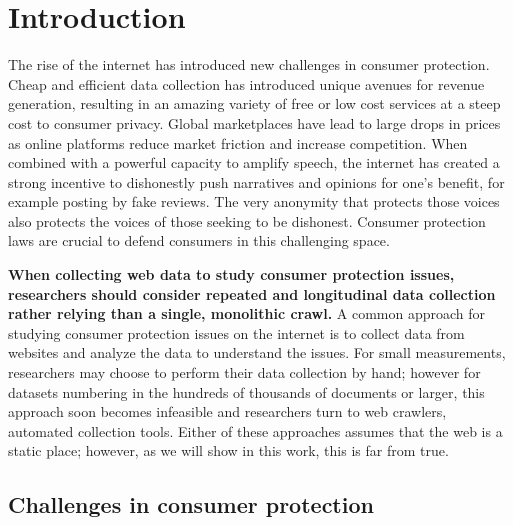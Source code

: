 \chapter{Introduction} \label{ch:introduction}


The rise of the internet has introduced new challenges in consumer protection. Cheap and efficient data collection has introduced unique avenues for revenue generation, resulting in an amazing variety of free or low cost services at a steep cost to consumer privacy. Global marketplaces have lead to large drops in prices as online platforms reduce market friction and increase competition. When combined with a powerful capacity to amplify speech, the internet has created a strong incentive to dishonestly push narratives and opinions for one's benefit, for example posting by fake reviews. The very anonymity that protects those voices also protects the voices of those seeking to be dishonest. Consumer protection laws are crucial to defend consumers in this challenging space.

\textbf{When collecting web data to study consumer protection issues, researchers should consider repeated and longitudinal data collection rather relying than a single, monolithic crawl.} A common approach for studying consumer protection issues on the internet is to collect data from websites and analyze the data to understand the issues. For small measurements, researchers may choose to perform their data collection by hand; however for datasets numbering in the hundreds of thousands of documents or larger, this approach soon becomes infeasible and researchers turn to web crawlers, automated collection tools. Either of these approaches assumes that the web is a static place; however, as we will show in this work, this is far from true.

\section{Challenges in consumer protection}

